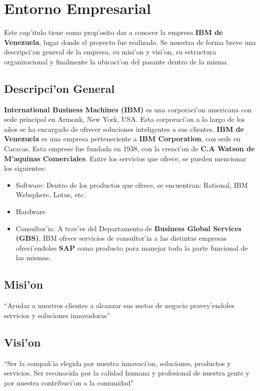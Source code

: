 \chapter{Entorno Empresarial} \label{chap:empresa}

	Este cap'itulo tiene como prop'osito dar a conocer la empresa \textbf{IBM de Venezuela}, lugar donde el proyecto fue realizado. Se muestra de forma breve una descripci'on general de la empresa, su misi'on y visi'on, su estructura organizacional y finalmente la ubicaci'on del pasante dentro de la misma.
\section{Descripci'on General} \label{sect:descripcion}
\textbf{International Business Machines (IBM)} es una corporaci'on americana con sede principal en Armonk, New York, USA. Esta corporaci'on a lo largo de los a\~nos se ha encargado de ofrecer soluciones inteligentes a sus clientes.
	\textbf{IBM de Venezuela} es una empresa perteneciente a \textbf{IBM Corporation}, con sede en Caracas. Esta emprese fue fundada en 1938, con la creaci'on de \textbf{C.A Watson de M'aquinas Comerciales}.   Entre los servicios que ofrece, se pueden mencionar los siguientes:
\begin{itemize}
\item Software: Dentro de los productos que ofrece, se encuentran: Rational, IBM Websphere, Lotus, etc.
\item Hardware
\item Consultor'ia: A trav'es del Departamento de \textbf{Business Global Services (GBS)}, IBM ofrece servicios de consultor'ia a las distintas empresas ofreci'endoles \textbf{SAP} como producto para manejar toda la parte funcional de las mismas.
\end{itemize}

\section{Misi'on} \label{sect:mision}
``Ayudar a nuestros clientes a alcanzar sus metas de negocio provey'endoles servicios y soluciones innovadoras''

\section{Visi'on} \label{sect:vision}
``Ser la compa\~n'ia elegida por nuestra innovaci'on, soluciones, productos y servicios. Ser reconocida por la calidad humana y profesional de nuestra gente y por nuestra contribuci'on a la comunidad"

